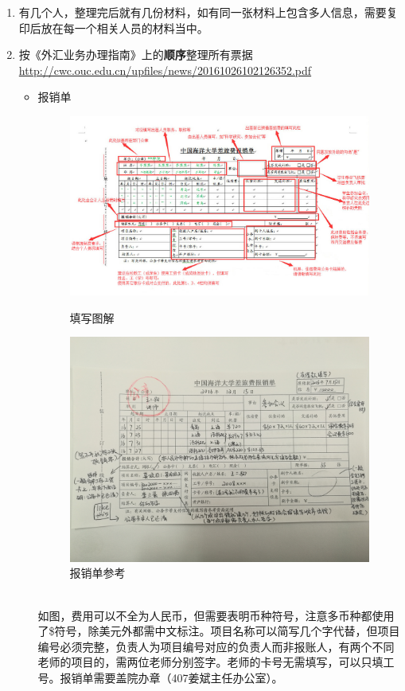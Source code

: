 \documentclass{article}
\begin{document}
\begin{enumerate}
\item 有几个人，整理完后就有几份材料，如有同一张材料上包含多人信息，需要复印后放在每一个相关人员的材料当中。
\item 按《外汇业务办理指南》上的\textbf{顺序}整理所有票据\url{http://cwc.ouc.edu.cn/upfiles/news/20161026102126352.pdf}
\begin{itemize}
\item 报销单\\
\begin{figure}[!htb] %
\begin{minipage}[c]{\textwidth}\centering
	\includegraphics[width=4.0in]{baoxiao} \caption{填写图解}
\end{minipage}	
\begin{minipage}[c]{\textwidth}\centering
	\includegraphics[width=4.0in]{baoxiao2}\caption{报销单参考}
\end{minipage}

\end{figure}\\
	如图，费用可以不全为人民币，但需要表明币种符号，注意多币种都使用了\$符号，除美元外都需中文标注。项目名称可以简写几个字代替，但项目编号必须完整，负责人为项目编号对应的负责人而非报账人，有两个不同老师的项目的，需两位老师分别签字。老师的卡号无需填写，可以只填工号。报销单需要盖院办章（407姜斌主任办公室）。\\



\end{itemize}
\end{enumerate}
\end{document}

